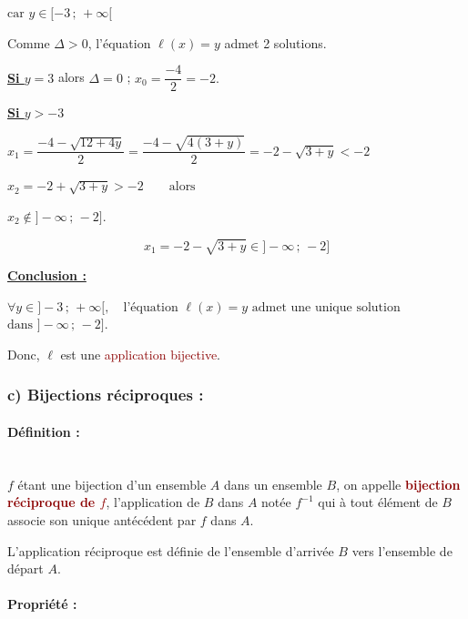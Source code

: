 \documentclass[12pt,a4paper]{article}
\begin{document}
\begin{enumerate}
\begin{enumerate}
$
\text{car } y\in[-3\,;\,+\infty[
$

Comme $\Delta>0$, l'équation $\ell(x)=y$ admet 2 solutions.

\bigskip

\underline{\textbf{Si $y=3$}} alors $\Delta=0$ ;
$
x_0=\dfrac{-4}{2}=-2.
$

\bigskip

\underline{\textbf{Si $y>-3$}}

$
x_1=
\dfrac{-4-\sqrt{12+4y}}{2}
=
\dfrac{-4-\sqrt{4(3+y)}}{2}
=
-2-\sqrt{3+y}
<-2
$

$
x_2=-2+\sqrt{3+y}>-2
\qquad \text{alors}
$

$
x_2\notin]-\infty\,;\,-2].
$

\[
\boxed{x_1=-2-\sqrt{3+y}\in]-\infty\,;\,-2]}
\]

\bigskip

\underline{\textbf{Conclusion :}}

$
\forall y\in]-3\,;\,+\infty[,
\quad
\text{l'équation }\ell(x)=y
\text{ admet une unique solution}
$
$
\text{dans }]-\infty\,;\,-2].
$

Donc, $\ell$ est une \textcolor{darkred}{application bijective}.
    \end{enumerate}

\end{enumerate}

\subsubsection*{\textbf{c) Bijections réciproques :}}

\paragraph{\color{darkred} Définition :}~\\

$f$ étant une bijection d'un ensemble $A$ dans un ensemble $B$, on appelle
\textcolor{darkred}{\textbf{bijection réciproque de $f$}}, l'application
de $B$ dans $A$ notée $f^{-1}$ qui à tout élément de $B$ associe son
unique antécédent par $f$ dans $A$.

L'application réciproque est définie de l'ensemble d'arrivée $B$ vers
l'ensemble de départ $A$.

\paragraph{\color{darkred} Propriété :}~\\
\end{document}
